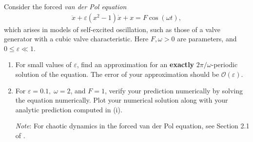 \begin{exercise}
Consider the forced \emph{van der Pol equation}
\begin{align}
	\ddot{x} + \varepsilon(x^2 - 1)\dot{x} + x = F\cos(\omega t),
\end{align} 
which arises in models of self-excited oscillation, such as those of a valve generator with a cubic valve characteristic. Here $F, \omega > 0$ are parameters, and $0 \leq \varepsilon \ll 1$.

\begin{enumerate}[label=(\roman*)]
	\item For small values of $\varepsilon$, find an approximation for an \textbf{exactly} $2\pi/\omega$-periodic solution of the equation. The error of your approximation should be $\mathcal{O}(\varepsilon)$.
	\item For $\varepsilon = 0.1, \; \omega = 2$, and $F = 1$, verify your prediction numerically by solving the equation numerically. Plot your numerical solution along with your analytic prediction computed in (i).

		\textit{Note}: For chaotic dynamics in the forced van der Pol equation, see Section 2.1 of \newline\cite{GuckenheimerHolmes}.
\end{enumerate}
\end{exercise}

